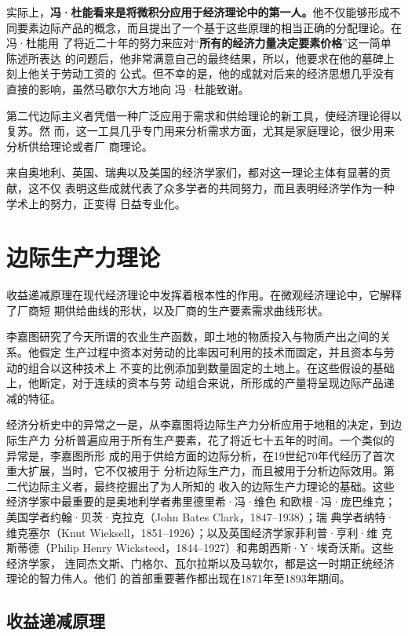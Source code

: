 实际上，\textbf{冯·杜能看来是将微积分应用于经济理论中的第一人。}他不仅能够形成不
同要素边际产品的概念，而且提出了一个基于这些原理的相当正确的分配理论。在冯·杜能用
了将近二十年的努力来应对“\textbf{所有的经济力量决定要素价格}”这一简单陈述所表达
的问题后，他非常满意自己的最终结果，所以，他要求在他的墓碑上刻上他关于劳动工资的
公式。但不幸的是，他的成就对后来的经济思想几乎没有直接的影响，虽然马歇尔大方地向
冯·杜能致谢。

第二代边际主义者凭借一种广泛应用于需求和供给理论的新工具，使经济理论得以复苏。然
而，这一工具几乎专门用来分析需求方面，尤其是家庭理论，很少用来分析供给理论或者厂
商理论。

来自奥地利、英国、瑞典以及美国的经济学家们，都对这一理论主体有显著的贡献，这不仅
表明这些成就代表了众多学者的共同努力，而且表明经济学作为一种学术上的努力，正变得
日益专业化。

\section{边际生产力理论}

收益递减原理在现代经济理论中发挥着根本性的作用。在微观经济理论中，它解释了厂商短
期供给曲线的形状，以及厂商的生产要素需求曲线形状。

李嘉图研究了今天所谓的农业生产函数，即土地的物质投入与物质产出之间的关系。他假定
生产过程中资本对劳动的比率因可利用的技术而固定，并且资本与劳动的组合以这种技术上
不变的比例添加到数量固定的土地上。在这些假设的基础上，他断定，对于连续的资本与劳
动组合来说，所形成的产量将呈现边际产品递减的特征。

经济分析史中的异常之一是，从李嘉图将边际生产力分析应用于地租的决定，到边际生产力
分析普遍应用于所有生产要素，花了将近七十五年的时间。一个类似的异常是，李嘉图所形
成的用于供给方面的边际分析，在19世纪70年代经历了首次重大扩展，当时，它不仅被用于
分析边际生产力，而且被用于分析边际效用。第二代边际主义者，最终挖掘出了为人所知的
收入的边际生产力理论的基础。这些经济学家中最重要的是奥地利学者弗里德里希·冯·维色
和欧根·冯·庞巴维克；美国学者约翰·贝茨·克拉克（John Bates Clark，1847--1938）；瑞
典学者纳特·维克塞尔（Knut Wieksell，1851--1926）；以及英国经济学家菲利普·亨利·维
克斯蒂德（Philip Henry Wicksteed，1844--1927）和弗朗西斯·Y·埃奇沃斯。这些经济学家，
连同杰文斯、门格尔、瓦尔拉斯以及马软尔，都是这一时期正统经济理论的智力伟人。他们
的首部重要著作都出现在1871年至1893年期间。

\subsection{收益递减原理}

